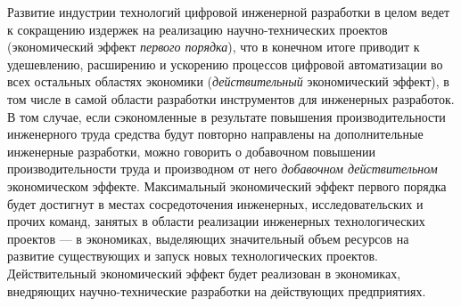 \documentclass{article}
\begin{document}
Развитие индустрии технологий цифровой инженерной разработки в целом ведет к сокращению издержек на реализацию научно-технических проектов (экономический эффект \textit{первого порядка}), что в конечном итоге приводит к удешевлению, расширению и ускорению процессов цифровой автоматизации во всех остальных областях экономики (\textit{действительный} экономический эффект), в том числе в самой области разработки инструментов для инженерных разработок. В том случае, если сэкономленные в результате повышения производительности инженерного труда средства будут повторно направлены на дополнительные инженерные разработки, можно говорить о добавочном повышении производительности труда и производном от него \textit{добавочном действительном} экономическом эффекте. Максимальный экономический эффект первого порядка будет достигнут в местах сосредоточения инженерных, исследовательских и прочих команд, занятых в области реализации инженерных технологических проектов — в экономиках, выделяющих значительный объем ресурсов на развитие существующих и запуск новых технологических проектов. Действительный экономический эффект будет реализован в экономиках, внедряющих научно-технические разработки на действующих предприятиях.
\end{document}
